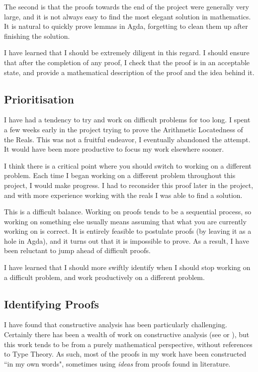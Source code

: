 \documentclass[ProjectReport]{subfiles}
\begin{document}
The second is that the proofs towards the end of the project were generally very large, and it is not always easy to find the most elegant solution in mathematics. It is natural to quickly prove lemmas in Agda, forgetting to clean them up after finishing the solution. 

I have learned that I should be extremely diligent in this regard. I should ensure that after the completion of any proof, I check that the proof is in an acceptable state, and provide a mathematical description of the proof and the idea behind it.

\subsection{Prioritisation}

I have had a tendency to try and work on difficult problems for too long. I spent a few weeks early in the project trying to prove the Arithmetic Locatedness of the Reals. This was not a fruitful endeavor, I eventually abandoned the attempt. It would have been more productive to focus my work elsewhere sooner. 

I think there is a critical point where you should switch to working on a different problem. Each time I began working on a different problem throughout this project, I would make progress. I had to reconsider this proof later in the project, and with more experience working with the reals I was able to find a solution. 

This is a difficult balance. Working on proofs tends to be a sequential process, so working on something else usually means assuming that what you are currently working on is correct. It is entirely feasible to postulate proofs (by leaving it as a hole in Agda), and it turns out that it is impossible to prove. As a result, I have been reluctant to jump ahead of difficult proofs. 

I have learned that I should more swiftly identify when I should stop working on a difficult problem, and work productively on a different problem.

\subsection{Identifying Proofs}

I have found that constructive analysis has been particularly challenging. Certainly there has been a wealth of work on constructive analysis (see \cite{troelstra1988constructivism} or \cite{Bishop1987-BISCA-2}), but this work tends to be from a purely mathematical perspective, without references to Type Theory. As such, most of the proofs in my work have been constructed ``in my own words", sometimes using \textit{ideas} from proofs found in literature. 
\end{document}

